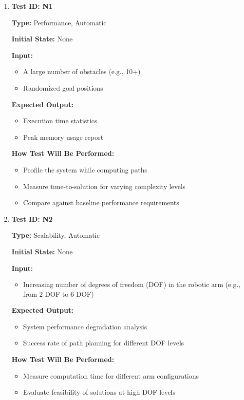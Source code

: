 \documentclass[12pt, titlepage]{article}
\begin{document}
\begin{enumerate}

\item \textbf{Test ID: N1}  

\textbf{Type:} Performance, Automatic  

\textbf{Initial State:} None  

\textbf{Input:}  
\begin{itemize}
    \item A large number of obstacles (e.g., 10+)  
    \item Randomized goal positions  
\end{itemize}

\textbf{Expected Output:}  
\begin{itemize}
    \item Execution time statistics  
    \item Peak memory usage report  
\end{itemize}

\textbf{How Test Will Be Performed:}  
\begin{itemize}
    \item Profile the system while computing paths  
    \item Measure time-to-solution for varying complexity levels  
    \item Compare against baseline performance requirements  
\end{itemize}

\item \textbf{Test ID: N2}  

\textbf{Type:} Scalability, Automatic  

\textbf{Initial State:} None  

\textbf{Input:}  
\begin{itemize}
    \item Increasing number of degrees of freedom (DOF) in the robotic arm (e.g., from 2-DOF to 6-DOF)  
\end{itemize}

\textbf{Expected Output:}  
\begin{itemize}
    \item System performance degradation analysis  
    \item Success rate of path planning for different DOF levels  
\end{itemize}

\textbf{How Test Will Be Performed:}  
\begin{itemize}
    \item Measure computation time for different arm configurations  
    \item Evaluate feasibility of solutions at high DOF levels  
\end{itemize}

\end{enumerate}
\end{document}
